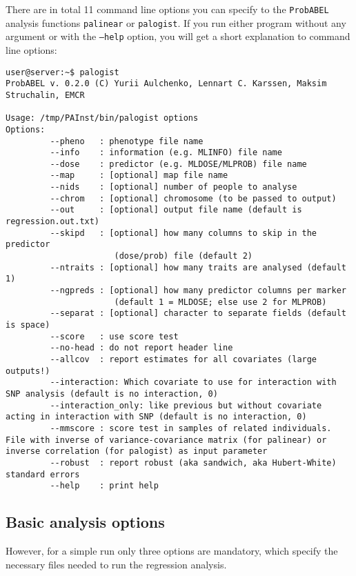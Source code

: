 \documentclass[12pt,a4paper]{article}
\newcommand{\PA}{\texttt{ProbABEL}}
\begin{document}
There are in total 11 command line options you can specify to the
\PA{} analysis functions \texttt{palinear} or \texttt{palogist}. If
you run either program without any argument or with the
\texttt{--help} option, you will get a short explanation to command
line options:
\begin{verbatim}
user@server:~$ palogist
ProbABEL v. 0.2.0 (C) Yurii Aulchenko, Lennart C. Karssen, Maksim Struchalin, EMCR

Usage: /tmp/PAInst/bin/palogist options
Options:
         --pheno   : phenotype file name
         --info    : information (e.g. MLINFO) file name
         --dose    : predictor (e.g. MLDOSE/MLPROB) file name
         --map     : [optional] map file name
         --nids    : [optional] number of people to analyse
         --chrom   : [optional] chromosome (to be passed to output)
         --out     : [optional] output file name (default is regression.out.txt)
         --skipd   : [optional] how many columns to skip in the predictor
                      (dose/prob) file (default 2)
         --ntraits : [optional] how many traits are analysed (default 1)
         --ngpreds : [optional] how many predictor columns per marker
                      (default 1 = MLDOSE; else use 2 for MLPROB)
         --separat : [optional] character to separate fields (default is space)
         --score   : use score test
         --no-head : do not report header line
         --allcov  : report estimates for all covariates (large outputs!)
         --interaction: Which covariate to use for interaction with SNP analysis (default is no interaction, 0)
         --interaction_only: like previous but without covariate acting in interaction with SNP (default is no interaction, 0)
         --mmscore : score test in samples of related individuals. File with inverse of variance-covariance matrix (for palinear) or inverse correlation (for palogist) as input parameter
         --robust  : report robust (aka sandwich, aka Hubert-White) standard errors
         --help    : print help
\end{verbatim}


\subsection{Basic analysis options}
However, for a simple run only three options are mandatory, which
specify the necessary files needed to run the regression analysis.
\end{document}
